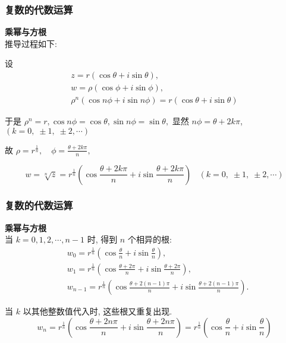 \documentclass{beamer}
\begin{document}
\begin{frame}[t]
\frametitle{复数的代数运算}
\textbf{乘幂与方根}\\
推导过程如下: 

设 
\begin{gather*}
z = r(\cos \theta + i\sin \theta ), \\
w = \rho (\cos \phi + i\sin \phi ), \\
{\rho ^n}(\cos n\phi + i\sin n\phi ) = r(\cos \theta + i\sin \theta ) 
\end{gather*}

于是 $ {\rho ^n} = r, \cos n\phi = \cos \theta,  \sin n\phi = \sin \theta,  $ 显然 $ n\phi = \theta + 2k\pi $,  $ (k = 0, \; \pm 1, \; \pm 2, \cdots ) $ 

故 $ \rho = {r^{\frac{1}{n}}}, \quad \phi = \frac{{\theta + 2k\pi}}{n}, $ 

\[w = \sqrt[n]{z} = {r^{\frac{1}{n}}}\left( {\cos \frac{{\theta + 2k\pi}}{n} + i\sin \frac{{\theta + 2k\pi}}{n}} \right)~~~~ (k = 0, \; \pm 1, \; \pm 2, \cdots )\]
\end{frame}


\begin{frame}[t]
\frametitle{复数的代数运算}
\textbf{乘幂与方根}\\
当 $ k = 0, 1, 2, \cdots, n - 1 $ 时,  得到 $ n $ 个相异的根: 
\begin{align*}
&{w_0} = {r^{\frac{1}{n}}}\left( {\cos \frac{\theta }{n} + i\sin \frac{\theta }{n}} \right), \\
&{w_1} = {r^{\frac{1}{n}}}\left( {\cos \frac{{\theta + 2\pi}}{n} + i\sin \frac{{\theta + 2\pi}}{n}} \right), \\
&{w_{n - 1}} = {r^{\frac{1}{n}}}\left( {\cos \frac{{\theta + 2(n - 1)\pi}}{n} + i\sin \frac{{\theta + 2(n - 1)\pi}}{n}} \right).
\end{align*}

当 $ k $ 以其他整数值代入时, 这些根又重复出现. 
\[ {w_n} = {r^{\frac{1}{n}}}\left( {\cos \frac{{\theta + 2n\pi}}{n} + i\sin \frac{{\theta + 2n\pi}}{n}} \right) = {r^{\frac{1}{n}}}\left( {\cos \frac{\theta }{n} + i\sin \frac{\theta }{n}} \right)\]
\end{frame}
\end{document}
